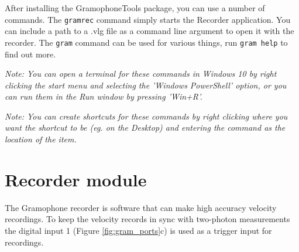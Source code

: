 \documentclass[11pt,a4paper]{article}
\newcommand{\note}[1]{\textit{Note: {#1}}}
\begin{document}
After installing the GramophoneTools package, you can use a number of commands. The \texttt{gramrec} command simply starts the Recorder application. You can include a path to a .vlg file as a command line argument to open it with the recorder. The \texttt{gram} command can be used for various things, run \texttt{gram help} to find out more.

\note{You can open a terminal for these commands in Windows 10 by right clicking the start menu and selecting the 'Windows PowerShell' option, or you can run them in the Run window by pressing 'Win+R'.}

\note{You can create shortcuts for these commands by right clicking where you want the shortcut to be (eg. on the Desktop) and entering the command as the location of the item.}

\section{Recorder module} 
The Gramophone recorder is software that can make high accuracy velocity recordings. To keep the velocity records in sync with two-photon measurements the digital input 1 (Figure \ref{fig:gram_ports}c) is used as a trigger input for recordings. 
\end{document}
